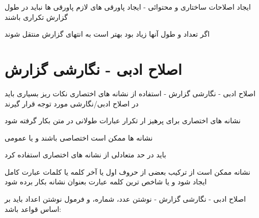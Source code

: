 \documentclass[14pt]{beamer}
\newcommand{\sectionfontsize}{\fontsize{22pt}{0pt}\selectfont}
\newcommand{\framefontsizelarge}{\fontsize{18pt}{0pt}\selectfont}
\newcommand{\frametitlefontsize}{\fontsize{20pt}{0pt}\selectfont}
\begin{document}
\begin{persian}
\begin{frame}[plain]{\frametitlefontsize ایجاد اصلاحات ساختاری و محتوائی - ایجاد پاورقی های لازم}
		پاورقی ها نباید در طول گزارش تکراری باشند
		
		اگر تعداد و طول آنها زیاد بود بهتر است به انتهای گزارش منتقل شوند
	\end{frame}	


	\section{\sectionfontsize اصلاح ادبی - نگارشی گزارش}

	\begin{frame}[plain]{\frametitlefontsize اصلاح ادبی - نگارشی گزارش - استفاده از نشانه های اختصاری}
		\framefontsizelarge
		نکات ریز بسیاری باید در اصلاح ادبی/نگارشی مورد توجه قرار گیرند
		
		نشانه های اختصاری برای پرهیز ار تکرار عبارات طولانی در متن بکار گرفته شود
		
		نشانه ها ممکن است اختصاصی باشند و یا عمومی
		
		باید در حد متعادلی از نشانه های اختصاری استفاده کرد
		
		نشانه ممکن است از ترکیب بعضی از حروف اول یا آخر کلمه یا کلمات عبارت کامل ایجاد شود و یا شاخص ترین کلمه عبارت بعنوان نشانه بکار برده شود
	\end{frame}	

	\begin{frame}[plain]{\frametitlefontsize اصلاح ادبی - نگارشی گزارش - نوشتن عدد، شماره، و فرمول}
		\framefontsizelarge
		نوشتن اعداد باید بر اساس قواعد باشد:
		
	\end{frame}	

\end{persian}
\end{document}
